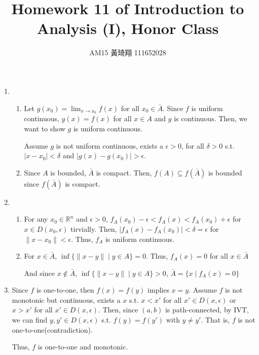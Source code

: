 \documentclass[12pt]{article}
\title{Homework 11 of Introduction to Analysis (I), Honor Class}
\author{AM15 黃琦翔 111652028}
\begin{document}
\maketitle
\begin{enumerate}
    \item \begin{enumerate}
        \item Let $g(x_0) = \displaystyle\lim_{x\to x_0} f(x)$ for all $x_0 \in \bar{A}$.
        Since $f$ is uniform continuous, $g(x) = f(x)$ for all $x\in A$ and $g$ is continuous.
        Then, we want to show $g$ is uniform continuous.

        Assume $g$ is not uniform continuous, exists a $\epsilon > 0$, for all $\delta > 0$ 
        s.t. $|x - x_0| < \delta$ and $|g(x) - g(x_0)| > \epsilon$.

        \item Since $A$ is bounded, $\bar{A}$ is compact.
        Then, $f(A) \subseteq f(\bar{A})$ is bounded since $f(\bar{A})$ is compact.
    \end{enumerate}

    \item \begin{enumerate}
        \item For any $x_0\in \mathbb{R}^n$ and $\epsilon > 0$, $f_A(x_0) - \epsilon < f_A(x) < f_A(x_0) + \epsilon$ for $x\in D(x_0, \epsilon)$ tirvially.
        Then, $|f_A(x) - f_A(x_0)| < \delta = \epsilon$ for $\| x - x_0 \| < \epsilon$.
        Thus, $f_A$ is uniform continuous.

        \item For $x\in \bar{A}$, $\inf\{ \| x-y\| \mid y\in A\} = 0$.
        Thus, $f_A(x) = 0$ for all $x\in \bar{A}$

        And since $x\notin \bar{A}$, $\inf\{ \| x-y\| \mid y\in A\} > 0$, $\bar{A} = \{ x\mid f_A(x) = 0\}$
    \end{enumerate}
    
    \item Since $f$ is one-to-one, then $f(x) = f(y)$ implies $x = y$.
    Assume $f$ is not monotonic but continuous, exists a $x$ s.t. $x < x'$ for all $x' \in D(x, \epsilon)$ 
    or $x > x'$ for all $x' \in D(x, \epsilon)$.
    Then, since $(a, b)$ is path-connected, by IVT, we can find $y, y'\in D(x, \epsilon)$ s.t. $f(y) = f(y')$ with $y \neq y'$.
    That is, $f$ is not one-to-one(contradiction).

    Thus, $f$ is one-to-one and monotonic.
\end{enumerate}
\end{document}
